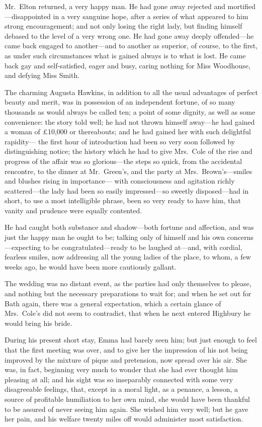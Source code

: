 Mr.\ Elton returned, a very happy man.  He had gone away rejected
and mortified---disappointed in a very sanguine hope, after a series
of what appeared to him strong encouragement; and not only losing
the right lady, but finding himself debased to the level of a very
wrong one.  He had gone away deeply offended---he came back engaged
to another---and to another as superior, of course, to the first,
as under such circumstances what is gained always is to what is lost.
He came back gay and self-satisfied, eager and busy, caring nothing
for Miss Woodhouse, and defying Miss Smith.

The charming Augusta Hawkins, in addition to all the usual advantages
of perfect beauty and merit, was in possession of an independent fortune,
of so many thousands as would always be called ten; a point of
some dignity, as well as some convenience:  the story told well;
he had not thrown himself away---he had gained a woman of \pounds 10,000
or thereabouts; and he had gained her with such delightful rapidity---%
the first hour of introduction had been so very soon followed by
distinguishing notice; the history which he had to give Mrs.\ Cole
of the rise and progress of the affair was so glorious---the steps
so quick, from the accidental rencontre, to the dinner at Mr.\ Green's,
and the party at Mrs.\ Brown's---smiles and blushes rising in importance---%
with consciousness and agitation richly scattered---the lady
had been so easily impressed---so sweetly disposed---had in short,
to use a most intelligible phrase, been so very ready to have him,
that vanity and prudence were equally contented.

He had caught both substance and shadow---both fortune and affection,
and was just the happy man he ought to be; talking only of himself
and his own concerns---expecting to be congratulated---ready to be
laughed at---and, with cordial, fearless smiles, now addressing
all the young ladies of the place, to whom, a few weeks ago,
he would have been more cautiously gallant.

The wedding was no distant event, as the parties had only themselves
to please, and nothing but the necessary preparations to wait for;
and when he set out for Bath again, there was a general expectation,
which a certain glance of Mrs.\ Cole's did not seem to contradict,
that when he next entered Highbury he would bring his bride.

During his present short stay, Emma had barely seen him; but just
enough to feel that the first meeting was over, and to give her
the impression of his not being improved by the mixture of pique
and pretension, now spread over his air.  She was, in fact,
beginning very much to wonder that she had ever thought him pleasing
at all; and his sight was so inseparably connected with some very
disagreeable feelings, that, except in a moral light, as a penance,
a lesson, a source of profitable humiliation to her own mind,
she would have been thankful to be assured of never seeing him again.
She wished him very well; but he gave her pain, and his welfare
twenty miles off would administer most satisfaction.


